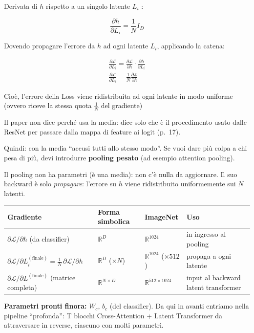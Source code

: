 \documentclass[
  11pt,
]{article}
\begin{document}
Derivata di \(h\) rispetto a un singolo latente \(L_{i}\) :

\[\frac{\partial h}{\partial L_{i}} = \frac{1}{N}I_{D}\]

Dovendo propagare l'errore da \(h\) ad ogni latente \(L_{i}\),
applicando la catena:

\[\begin{matrix}
\frac{\partial\mathcal{L}}{\partial L_{i}} = \frac{\partial\mathcal{L}}{\partial h} \cdot \frac{\partial h}{\partial L_{i}} \\
\frac{\partial\mathcal{L}}{\partial L_{i}} = \frac{1}{N}\frac{\partial\mathcal{L}}{\partial h}
\end{matrix}\]

Cioè, l'errore della Loss viene ridistribuita ad ogni latente in modo
uniforme (ovvero riceve la stessa quota \(\frac{1}{N}\) del gradiente)

Il paper non dice perché usa la media: dice solo che è il procedimento usato dalle ResNet per passare dalla mappa di feature ai logit (p.~17).

Quindi: con la media ``accusi tutti allo stesso modo''. Se vuoi dare più
colpa a chi pesa di più, devi introdurre \textbf{pooling pesato} (ad
esempio attention pooling).

\begin{notabox}[title={\textbf{Checkpoint gradienti --- fine Pooling backward}}]
Il pooling non ha parametri (è una media): non c'è nulla da aggiornare. Il suo backward è solo \emph{propagare}: l'errore su $h$ viene ridistribuito uniformemente sui $N$ latenti.

\medskip
\begin{center}
\begin{tabular}{@{}llll@{}}
\toprule
\textbf{Gradiente} & \textbf{Forma simbolica} & \textbf{ImageNet} & \textbf{Uso} \\
\midrule
$\partial\mathcal{L}/\partial h$ (da classifier) & $\mathbb{R}^{D}$ & $\mathbb{R}^{1024}$ & in ingresso al pooling \\
$\partial\mathcal{L}/\partial L_i^{(\text{finale})} = \frac{1}{N}\,\partial\mathcal{L}/\partial h$ & $\mathbb{R}^{D}$ ($\times N$) & $\mathbb{R}^{1024}$ ($\times 512$) & propaga a ogni latente \\
$\partial\mathcal{L}/\partial L^{(\text{finale})}$ (matrice completa) & $\mathbb{R}^{N \times D}$ & $\mathbb{R}^{512 \times 1024}$ & input al backward latent transformer \\
\bottomrule
\end{tabular}
\end{center}

\medskip
\textbf{Parametri pronti finora:} $W_c$, $b_c$ (del classifier). Da qui in avanti entriamo nella pipeline ``profonda'': T blocchi Cross-Attention + Latent Transformer da attraversare in reverse, ciascuno con molti parametri.
\end{notabox}
\end{document}
